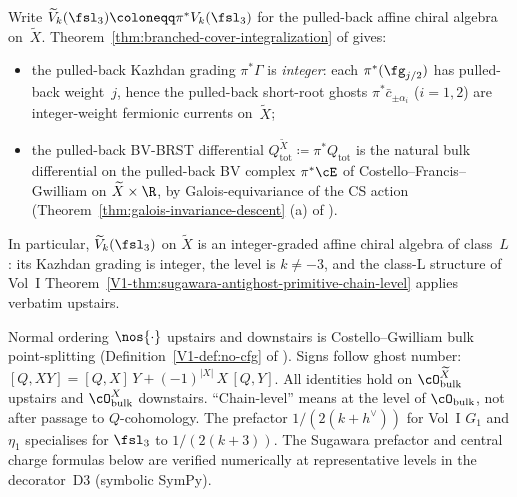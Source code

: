 \begin{definition}
\label{def:bp-pulled-back-algebra}
Write $\widetilde V_k(\fsl_3) \coloneqq \pi^{\ast} V_k(\fsl_3)$
for the pulled-back affine chiral algebra on~$\widetilde X$.
Theorem~\ref{thm:branched-cover-integralization} of
\cite[\S\ref*{subsec:branched-cover}]{Vol2-fractional-ghost-platonic} gives:
\begin{itemize}[nosep]
\item the pulled-back Kazhdan grading $\pi^{\ast}\Gamma$ is
 \emph{integer}: each $\pi^{\ast}(\fg_{j/2})$ has pulled-back
 weight~$j$, hence the pulled-back short-root ghosts
 $\pi^{\ast}\bar c_{\pm\alpha_i}$ ($i = 1, 2$) are integer-weight
 fermionic currents on~$\widetilde X$;
\item the pulled-back BV-BRST differential
 $Q_{\mathrm{tot}}^{\widetilde X} \coloneqq \pi^{\ast}Q_{\mathrm{tot}}$
 is the natural bulk differential on the pulled-back BV complex
 $\pi^{\ast}\cE$ of Costello--Francis--Gwilliam on
 $\widetilde X \times \R$, by Galois-equivariance of the CS action
 (Theorem~\ref{thm:galois-invariance-descent} (a) of
 \cite[\S\ref*{subsec:galois-descent}]{Vol2-fractional-ghost-platonic}).
\end{itemize}
In particular, $\widetilde V_k(\fsl_3)$ on $\widetilde X$ is an
integer-graded affine chiral algebra of class~$L$: its Kazhdan
grading is integer, the level is $k \ne -3$, and the class-L
structure of Vol~I Theorem~\ref{V1-thm:sugawara-antighost-primitive-chain-level}
applies verbatim upstairs.
\end{definition}

\begin{convention}[Conventions]
\label{conv:bp-platonic}
Normal ordering $\nos{\cdot}$ upstairs and downstairs is
Costello--Gwilliam bulk point-splitting
(Definition~\ref{V1-def:no-cfg} of
\cite[\S\ref*{V1-sec:setup-brst-affine-km}]{Vol1-class-L-antighost}).
Signs follow ghost number: $[Q, XY] = [Q,X]\,Y + (-1)^{|X|}\,X\,[Q,Y]$.
All identities hold on
$\cO_{\mathrm{bulk}}^{\widetilde X}$ upstairs and
$\cO_{\mathrm{bulk}}^{X}$ downstairs. ``Chain-level'' means at the
level of $\cO_{\mathrm{bulk}}$, not after passage to $Q$-cohomology.
The prefactor $1/(2(k+h^{\vee}))$ for Vol~I $G_1$ and $\eta_1$
specialises for $\fsl_3$ to $1/(2(k+3))$. The Sugawara prefactor
and central charge formulas below are verified numerically at
representative levels in the decorator~D3 (symbolic SymPy).
\end{convention}

